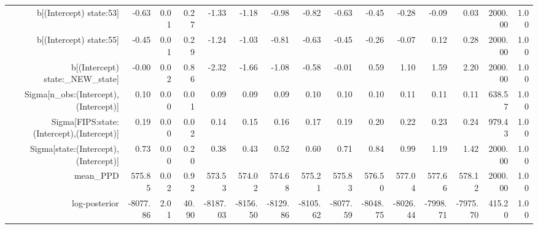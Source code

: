 \begin{table}[ht]
\begin{tabular}{rrrrrrrrrrrrrrr}
  b[(Intercept) state:53] & -0.63 & 0.01 & 0.27 & -1.33 & -1.18 & -0.98 & -0.82 & -0.63 & -0.45 & -0.28 & -0.09 & 0.03 & 2000.00 & 1.00 \\ 
  b[(Intercept) state:55] & -0.45 & 0.01 & 0.29 & -1.24 & -1.03 & -0.81 & -0.63 & -0.45 & -0.26 & -0.07 & 0.12 & 0.28 & 2000.00 & 1.00 \\ 
  b[(Intercept) state:\_NEW\_state] & -0.00 & 0.02 & 0.86 & -2.32 & -1.66 & -1.08 & -0.58 & -0.01 & 0.59 & 1.10 & 1.59 & 2.20 & 2000.00 & 1.00 \\ 
  Sigma[n\_obs:(Intercept),(Intercept)] & 0.10 & 0.00 & 0.01 & 0.09 & 0.09 & 0.09 & 0.10 & 0.10 & 0.10 & 0.11 & 0.11 & 0.11 & 638.57 & 1.00 \\ 
  Sigma[FIPS:state:(Intercept),(Intercept)] & 0.19 & 0.00 & 0.02 & 0.14 & 0.15 & 0.16 & 0.17 & 0.19 & 0.20 & 0.22 & 0.23 & 0.24 & 979.43 & 1.00 \\ 
  Sigma[state:(Intercept),(Intercept)] & 0.73 & 0.00 & 0.20 & 0.38 & 0.43 & 0.52 & 0.60 & 0.71 & 0.84 & 0.99 & 1.19 & 1.42 & 2000.00 & 1.00 \\ 
  mean\_PPD & 575.85 & 0.02 & 0.92 & 573.53 & 574.02 & 574.68 & 575.21 & 575.83 & 576.50 & 577.04 & 577.66 & 578.12 & 2000.00 & 1.00 \\ 
  log-posterior & -8077.86 & 2.01 & 40.90 & -8187.03 & -8156.50 & -8129.86 & -8105.62 & -8077.59 & -8048.75 & -8026.44 & -7998.71 & -7975.70 & 415.20 & 1.00 \\ 
   \hline
\end{tabular}
\end{table}
